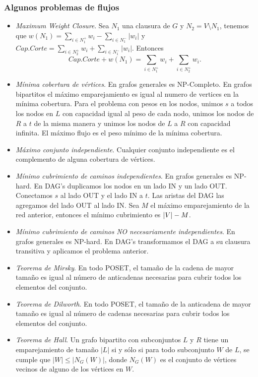 \documentclass[12 pts,spanish,mexico]{article}
\numberwithin{equation}{section}
\newcommand{\pa}[1]{\left( #1 \right)}
\begin{document}
\begin{multicols}{2}
\subsubsection{Algunos problemas de flujos}
\begin{itemize}
    \item \textit{Maximum Weight Closure}. Sea $N_1$ una clausura de $G$ y $N_2 = V \setminus N_1$, tenemos que $w\pa{N_1} = \sum_{i \in N_1^+} w_i - \sum_{i \in N_1^-} |w_i|$ y $Cap.Corte = \sum_{i \in N_2^+} w_i + \sum_{i \in N_1^-} |w_i|$. Entonces
    $$Cap.Corte + w(N_1) = \sum_{i \in N_1^+} w_i + \sum_{i \in N_2^+} w_i.$$
    \item \textit{Mínima cobertura de vértices}. En grafos generales es NP-Completo. En grafos bipartitos el máximo emparejamiento es igual al numero de vertices en la mínima cobertura. Para el problema con pesos en los nodos, unimos $s$ a todos los nodos en $L$ con capacidad igual al peso de cada nodo, unimos los nodos de $R$ a $t$ de la misma manera y unimos los nodos de $L$ a $R$ con capacidad infinita. El máximo flujo es el peso mínimo de la mínima cobertura.
    \item \textit{Máximo conjunto independiente}. Cualquier conjunto independiente es el complemento de alguna cobertura de vértices.
    \item \textit{Mínimo cubrimiento de caminos independientes}. En grafos generales es NP-hard. En DAG's duplicamos los nodos en un lado IN y un lado OUT. Conectamos $s$ al lado OUT y el lado IN a $t$. Las aristas del DAG las agregamos del lado OUT al lado IN. Sea $M$ el máximo emparejamiento de la red anterior, entonces el mínimo cubrimiento es $\abs{V} - M$.
    \item \textit{Mínimo cubrimiento de caminos NO necesariamente independientes}. En grafos generales es NP-hard. En DAG's transformamos el DAG a su clausura transitiva y aplicamos el problema anterior.
    \item \textit{Teorema de Mirsky}. En todo POSET, el tamaño de la cadena de mayor tamaño es igual al número de anticadenas necesarias para cubrir todos los elementos del conjunto.
    \item \textit{Teorema de Dilworth}. En todo POSET, el tamaño de la anticadena de mayor tamaño es igual al número de cadenas necesarias para cubrir todos los elementos del conjunto.
    \item \textit{Teorema de Hall}. Un grafo bipartito con subconjuntos $L$ y $R$ tiene un emparejamiento de tamaño $|L|$ si y sólo si para todo subconjunto $W$ de $L$, se cumple que $|W| \leq |N_G(W)|$, donde $N_G(W)$ es el conjunto de vértices vecinos de alguno de los vértices en $W$.
\end{itemize}


\end{multicols}
\end{document}
